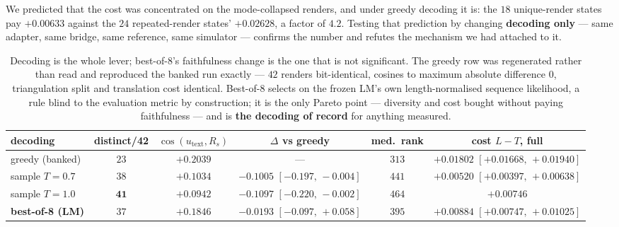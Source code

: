 \documentclass[11pt]{article}
\begin{document}
We predicted that the cost was concentrated on the mode-collapsed renders, and under greedy decoding
it is: the $18$ unique-render states pay $+0.00633$ against the $24$ repeated-render states'
$+0.02628$, a factor of $4.2$. Testing that prediction by changing \textbf{decoding only} --- same
adapter, same bridge, same reference, same simulator --- confirms the number and refutes the
mechanism we had attached to it.

\begin{table}[h]
\centering\scriptsize\setlength{\tabcolsep}{3.5pt}
\begin{tabular}{@{}lccccc@{}}
\toprule
\textbf{decoding} & \textbf{distinct/42} & \textbf{$\cos(u_{\text{text}},R_s)$} &
\textbf{$\Delta$ vs greedy} & \textbf{med.\ rank} & \textbf{cost $L-T$, full} \\
\midrule
greedy (banked) & $23$ & $\mathbf{+0.2039}$ & --- & $313$ &
$+0.01802$ $[+0.01668,\,+0.01940]$ \\
sample $T{=}0.7$ & $38$ & $+0.1034$ & $-0.1005$ $[-0.197,\,-0.004]$ & $441$ &
$\mathbf{+0.00520}$ $[+0.00397,\,+0.00638]$ \\
sample $T{=}1.0$ & $\mathbf{41}$ & $+0.0942$ & $-0.1097$ $[-0.220,\,-0.002]$ & $464$ & $+0.00746$ \\
\textbf{best-of-8 (LM)} & $37$ & $\mathbf{+0.1846}$ & $-0.0193$ $[-0.097,\,+0.058]$ & $395$ &
$\mathbf{+0.00884}$ $[+0.00747,\,+0.01025]$ \\
\bottomrule
\end{tabular}
\caption{Decoding is the whole lever; best-of-8's faithfulness change is the one that is not
significant. The greedy row was regenerated rather than read and reproduced
the banked run exactly --- $42$ renders bit-identical, cosines to maximum absolute difference $0$,
triangulation split and translation cost identical. Best-of-8 selects on the frozen LM's own
length-normalised sequence likelihood, a rule blind to the evaluation metric by construction; it is
the only Pareto point --- diversity and cost bought without paying faithfulness --- and is
\textbf{the decoding of record} for anything measured.}
\label{tab:c4c}
\end{table}
\end{document}
